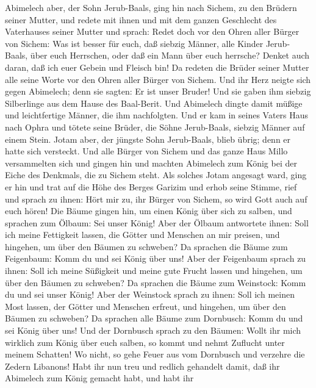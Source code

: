  Abimelech aber, der Sohn Jerub-Baals, ging hin nach
Sichem, zu den Brüdern seiner Mutter, und redete mit ihnen und mit dem
ganzen Geschlecht des Vaterhauses seiner Mutter und sprach:
 Redet doch vor den Ohren aller Bürger von Sichem: Was ist
besser für euch, daß siebzig Männer, alle Kinder Jerub-Baals, über euch
Herrschen, oder daß ein Mann über euch herrsche? Denket auch daran, daß
ich euer Gebein und Fleisch bin!  Da redeten die Brüder
seiner Mutter alle seine Worte vor den Ohren aller Bürger von Sichem.
Und ihr Herz neigte sich gegen Abimelech; denn sie sagten: Er ist unser
Bruder!  Und sie gaben ihm siebzig Silberlinge aus dem
Hause des Baal-Berit. Und Abimelech dingte damit müßige und
leichtfertige Männer, die ihm nachfolgten.  Und er kam in
seines Vaters Haus nach Ophra und tötete seine Brüder, die Söhne
Jerub-Baals, siebzig Männer auf einem Stein. Jotam aber, der jüngste
Sohn Jerub-Baals, blieb übrig; denn er hatte sich versteckt.
 Und alle Bürger von Sichem und das ganze Haus Millo
versammelten sich und gingen hin und machten Abimelech zum König bei der
Eiche des Denkmals, die zu Sichem steht.  Als solches
Jotam angesagt ward, ging er hin und trat auf die Höhe des Berges
Garizim und erhob seine Stimme, rief und sprach zu ihnen: Hört mir zu,
ihr Bürger von Sichem, so wird Gott auch auf euch hören! 
Die Bäume gingen hin, um einen König über sich zu salben, und sprachen
zum Ölbaum: Sei unser König!  Aber der Ölbaum antwortete
ihnen: Soll ich meine Fettigkeit lassen, die Götter und Menschen an mir
preisen, und hingehen, um über den Bäumen zu schweben? 
Da sprachen die Bäume zum Feigenbaum: Komm du und sei König über uns!
 Aber der Feigenbaum sprach zu ihnen: Soll ich meine
Süßigkeit und meine gute Frucht lassen und hingehen, um über den Bäumen
zu schweben?  Da sprachen die Bäume zum Weinstock: Komm
du und sei unser König!  Aber der Weinstock sprach zu
ihnen: Soll ich meinen Most lassen, der Götter und Menschen erfreut, und
hingehen, um über den Bäumen zu schweben?  Da sprachen
alle Bäume zum Dornbusch: Komm du und sei König über uns!
 Und der Dornbusch sprach zu den Bäumen: Wollt ihr mich
wirklich zum König über euch salben, so kommt und nehmt Zuflucht unter
meinem Schatten! Wo nicht, so gehe Feuer aus vom Dornbusch und verzehre
die Zedern Libanons!  Habt ihr nun treu und redlich
gehandelt damit, daß ihr Abimelech zum König gemacht habt, und habt ihr
